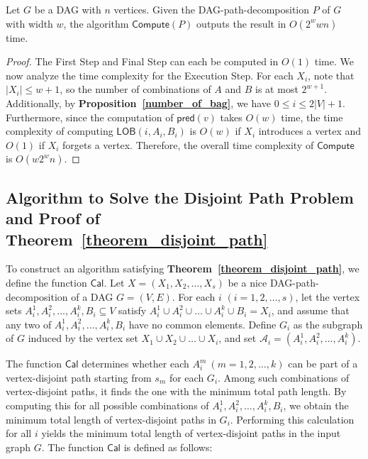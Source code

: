 \documentclass[runningheads]{llncs}
\theoremstyle{plain}
\theoremstyle{definition}
\begin{document}
\begin{lemma}\label{complexity_lob}
    Let $G$ be a DAG with $n$ vertices. Given the DAG-path-decomposition $P$ of $G$ with width $w$, the algorithm $\mathsf{Compute}(P)$ outputs the result in $O(2^w w n)$ time.
\end{lemma}
    
\begin{proof}
    The First Step and Final Step can each be computed in $O(1)$ time. We now analyze the time complexity for the Execution Step. For each $X_i$, note that $|X_i| \leq w+1$, so the number of combinations of $A$ and $B$ is at most $2^{w+1}$. Additionally, by \textbf{Proposition~\ref{number_of_bag}}, we have $0 \leq i \leq 2|V|+1$. Furthermore, since the computation of $\mathsf{pred}(v)$ takes $O(w)$ time, the time complexity of computing $\mathsf{LOB}(i, A_i, B_i)$ is $O(w)$ if $X_i$ introduces a vertex and $O(1)$ if $X_i$ forgets a vertex. Therefore, the overall time complexity of $\mathsf{Compute}$ is $O(w 2^w n)$.
\end{proof}












\subsection{Algorithm to Solve the Disjoint Path Problem and Proof of \textbf{Theorem~\ref{theorem_disjoint_path}}}\label{appendix_B6}

To construct an algorithm satisfying \textbf{Theorem~\ref{theorem_disjoint_path}}, we define the function $\mathsf{Cal}$. Let $X = (X_1, X_2, \dots, X_s)$ be a nice DAG-path-decomposition of a DAG $G = (V, E)$. For each $i$ $(i = 1, 2, \dots, s)$, let the vertex sets $A^1_i, A^2_i, \dots, A^k_i, B_i \subseteq V$ satisfy $A^1_i \cup A^2_i \cup \dots \cup A^k_i \cup B_i = X_i$, and assume that any two of $A^1_i, A^2_i, \dots, A^k_i, B_i$ have no common elements. Define $G_i$ as the subgraph of $G$ induced by the vertex set $X_1 \cup X_2 \cup \dots \cup X_i$, and set $\mathscr{A}_i = (A^1_i, A^2_i, \dots, A^k_i)$.

The function $\mathsf{Cal}$ determines whether each $A^m_i\ (m=1, 2, \dots, k)$ can be part of a vertex-disjoint path starting from $s_m$ for each $G_i$. Among such combinations of vertex-disjoint paths, it finds the one with the minimum total path length. By computing this for all possible combinations of $A^1_i, A^2_i, \dots, A^k_i, B_i$, we obtain the minimum total length of vertex-disjoint paths in $G_i$. Performing this calculation for all $i$ yields the minimum total length of vertex-disjoint paths in the input graph $G$. The function $\mathsf{Cal}$ is defined as follows:
\end{document}
